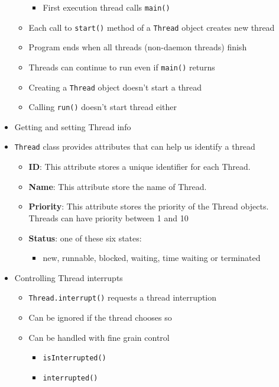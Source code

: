 \documentclass[a4paper]{article}
\newcommand{\inline}[1]{\lstinline!#1!}%
\begin{document}
\begin{itemize}
\begin{itemize}
					\begin{itemize}
						\item First execution thread calls \inline{main()}
					\end{itemize}
				\item Each call to \inline{start()} method of a \inline{Thread} object creates new thread
				\item Program ends when all threads (non-daemon threads) finish
				\item Threads can continue to run even if \inline{main()} returns
				\item Creating a \inline{Thread} object doesn't start a thread
				\item Calling \inline{run()} doesn't start  thread either
 			\end{itemize}
 		\item Getting and setting Thread info
 			\item \inline{Thread} class provides attributes that can help us identify a thread
 				\begin{itemize}
 					\item \textbf{ID}: This attribute stores a unique identifier for each Thread.
 					\item \textbf{Name}: This attribute store the name of Thread.
 					\item \textbf{Priority}: This attribute stores the priority of the Thread objects. Threads can have priority between 1 and 10
 					\item \textbf{Status}: one of these six states:
 						\begin{itemize}
 							\item new, runnable, blocked, waiting, time waiting or terminated
 						\end{itemize} 					
 				\end{itemize}
 		\item Controlling Thread interrupts
 			\begin{itemize}
 				\item \inline{Thread.interrupt()} requests a thread interruption
 				\item Can be ignored if the thread chooses so
 				\item Can be handled with fine grain control
 					\begin{itemize}
 						\item \inline{isInterrupted()}
 						\item \inline{interrupted()}
 					\end{itemize}

\end{itemize}
\end{itemize}
\end{document}
